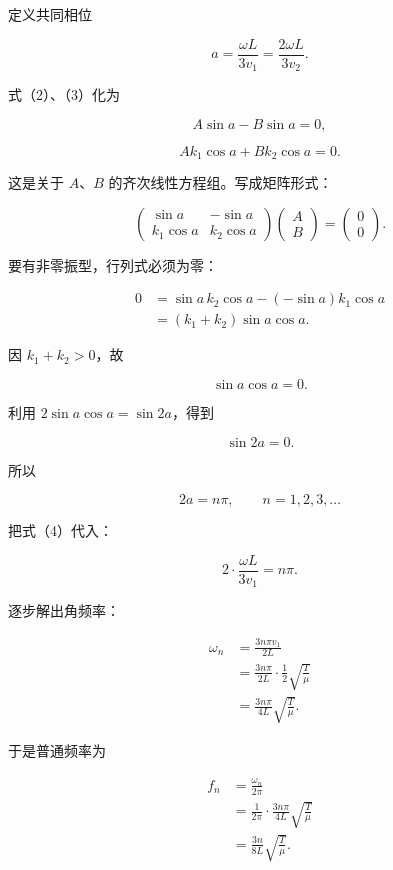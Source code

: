 \documentclass[12pt,a4paper,UTF8]{ctexart}
\begin{document}
定义共同相位

\[
a=\frac{\omega L}{3v_1}
=\frac{2\omega L}{3v_2}. \tag{4}
\]

式（2）、（3）化为

\[
A\sin a-B\sin a=0, \tag{5}
\]

\[
Ak_1\cos a+Bk_2\cos a=0. \tag{6}
\]

这是关于 \(A\)、\(B\) 的齐次线性方程组。写成矩阵形式：

\[
\begin{pmatrix}
\sin a&-\sin a\\
k_1\cos a&k_2\cos a
\end{pmatrix}
\begin{pmatrix}A\\B\end{pmatrix}
=\begin{pmatrix}0\\0\end{pmatrix}.
\]

要有非零振型，行列式必须为零：

\[
\begin{aligned}
0
&=\sin a\,k_2\cos a
-(-\sin a)k_1\cos a\\
&=(k_1+k_2)\sin a\cos a.
\end{aligned}
\]

因 \(k_1+k_2>0\)，故

\[
\sin a\cos a=0.
\]

利用 \(2\sin a\cos a=\sin2a\)，得到

\[
\sin2a=0.
\]

所以

\[
2a=n\pi,
\qquad n=1,2,3,\ldots \tag{7}
\]

把式（4）代入：

\[
2\cdot\frac{\omega L}{3v_1}=n\pi.
\]

逐步解出角频率：

\[
\begin{aligned}
\omega_n
&=\frac{3n\pi v_1}{2L}\\
&=\frac{3n\pi}{2L}\cdot\frac12\sqrt{\frac T\mu}\\
&=\frac{3n\pi}{4L}\sqrt{\frac T\mu}.
\end{aligned}
\]

于是普通频率为

\[
\begin{aligned}
f_n
&=\frac{\omega_n}{2\pi}\\
&=\frac1{2\pi}\cdot\frac{3n\pi}{4L}\sqrt{\frac T\mu}\\
&=\boxed{\frac{3n}{8L}\sqrt{\frac T\mu}}.
\end{aligned} \tag{8}
\]
\end{document}
